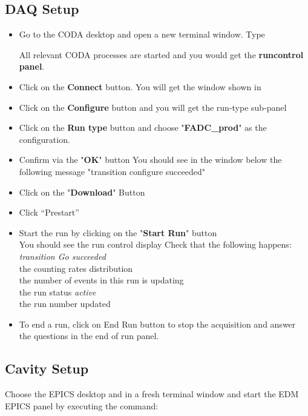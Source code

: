 \subsection{DAQ Setup}

\begin{itemize}
\item Go to the CODA desktop and open a new terminal window. Type


All relevant CODA processes are started and you would get the {\bf runcontrol panel}. 

\item Click on the {\bf Connect} button. You will get the  window shown in
\item Click on the {\bf Configure} button and you will get the run-type sub-panel 
\item Click on the {\bf Run type} button and choose "{\bf FADC\_prod}" as the  configuration.

\item Confirm via the "{\bf OK}" button
You should see in the window below the following message "transition
configure succeeded"
\item Click on the "{\bf Download}" Button
\item Click ``Prestart''
\item Start the run by clicking on the "{\bf Start Run}" button\\
You should see the run control display
Check that the following happens:\\

{\it transition Go succeeded}\\
the counting rates distribution\\
the number of events in this run is updating\\
the run status {\it active}\\
the run number updated\\

\item To end a run, click on End Run button to stop the acquisition and answer the questions in the end of run panel.
\end{itemize}



\subsection{Cavity Setup}
Choose the EPICS desktop and in a fresh terminal window and start the EDM~\cite{MEDMwww} EPICS panel 
 by executing  the command:\\

